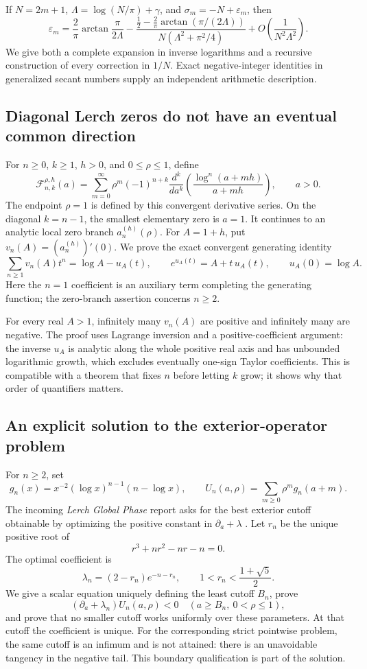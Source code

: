 If $N=2m+1$, $\Lambda=\log(N/\pi)+\gamma$, and
$\sigma_m=-N+\varepsilon_m$, then
\[
 \varepsilon_m=
 \frac2\pi\arctan\frac{\pi}{2\Lambda}
 -\frac{\frac12-\frac2\pi\arctan(\pi/(2\Lambda))}
        {N(\Lambda^2+\pi^2/4)}
 +O\!\left(\frac1{N^2\Lambda^2}\right).
\]
We give both a complete expansion in inverse logarithms and a recursive
construction of every correction in $1/N$. Exact negative-integer
identities in generalized secant numbers supply an independent arithmetic
description.

\subsection{Diagonal Lerch zeros do not have an eventual common direction}

For $n\ge0$, $k\ge1$, $h>0$, and $0\le\rho\le1$, define
\[
 \mathscr F_{n,k}^{\rho,h}(a)=
 \sum_{m=0}^{\infty}\rho^m(-1)^{n+k}
 \frac{d^k}{da^k}\left(\frac{\log^n(a+mh)}{a+mh}\right),
 \qquad a>0.
\]
The endpoint $\rho=1$ is defined by this convergent derivative series.
On the diagonal $k=n-1$, the smallest elementary zero is $a=1$.
It continues to an analytic local zero branch $a_n^{(h)}(\rho)$.
For $A=1+h$, put $v_n(A)=(a_n^{(h)})'(0)$.
We prove the exact convergent generating identity
\[
 \sum_{n\ge1}v_n(A)t^n=\log A-u_A(t),\qquad
 e^{u_A(t)}=A+t\,u_A(t),\qquad u_A(0)=\log A.
\]
Here the $n=1$ coefficient is an auxiliary term completing the generating
function; the zero-branch assertion concerns $n\ge2$.

For every real $A>1$, infinitely many $v_n(A)$ are positive and infinitely
many are negative. The proof uses Lagrange inversion and a
positive-coefficient argument: the inverse $u_A$ is analytic along the
whole positive real axis and has unbounded logarithmic growth, which
excludes eventually one-sign Taylor coefficients. This is compatible
with a theorem that fixes $n$ before letting $k$ grow; it shows why that
order of quantifiers matters.

\subsection{An explicit solution to the exterior-operator problem}

For $n\ge2$, set
\[
 g_n(x)=x^{-2}(\log x)^{n-1}(n-\log x),\qquad
 U_n(a,\rho)=\sum_{m\ge0}\rho^m g_n(a+m).
\]
The incoming \emph{Lerch Global Phase} report asks for the best exterior
cutoff obtainable by optimizing the positive constant in
$\partial_a+\lambda$ \cite{IncomingPhase}. Let $r_n$ be the unique
positive root of
\[
 r^3+nr^2-nr-n=0.
\]
The optimal coefficient is
\[
 \lambda_n=(2-r_n)e^{-n-r_n},\qquad 1<r_n<\frac{1+\sqrt5}{2}.
\]
We give a scalar equation uniquely defining the least cutoff $B_n$,
prove
\[
 (\partial_a+\lambda_n)U_n(a,\rho)<0
 \quad(a\ge B_n,\ 0<\rho\le1),
\]
and prove that no smaller cutoff works uniformly over these parameters.
At that cutoff the coefficient is unique. For the corresponding strict
pointwise problem, the same cutoff is an infimum and is not attained:
there is an unavoidable tangency in the negative tail. This boundary
qualification is part of the solution.

